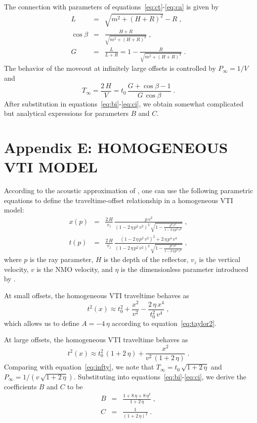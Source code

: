 The connection with parameters of equations~\ref{eq:ct}-\ref{eq:ca} is given by
\begin{eqnarray}
\label{eq:l}
L & = & \sqrt{m^2 + (H+R)^2} - R\;,   \\
\label{eq:cbeta}
\cos{\beta} & = & \frac{H+R}{\sqrt{m^2 + (H+R)^2}}\;, \\
\label{eq:g}
G & = & \frac{L}{L+R} = 1 - \frac{R}{\sqrt{m^2 + (H+R)^2}}\;.
\end{eqnarray}
The behavior of the moveout at infinitely large offsets is controlled by $P_{\infty} = 1/V$ and
\begin{equation}
\label{eq:ctinf3}
T_{\infty} = \frac{2\,H}{V} = t_0\,\frac{G+\cos{\beta} - 1}{G\,\cos{\beta}}\;. 
\end{equation}
After substitution in equations~\ref{eq:bi}-\ref{eq:ci}, we obtain
somewhat complicated but analytical expressions for parameters $B$ and
$C$.

\appendix
\section{Appendix E: HOMOGENEOUS VTI MODEL}

According to the acoustic approximation of
\cite{GEO63-02-06230631}, one can use the following parametric
equations to define the traveltime-offset relationship in a
homogeneous VTI model:
\begin{eqnarray}
\label{eq:xpvti}
x(p) & = & \frac{2\,H}{v_z}\,\frac{p\,v^2}{(1-2\,\eta\,p^2\,v^2)^2\,\sqrt{1-\frac{p^2\,v^2}{1-2\,\eta\,p^2\,v^2}}}\;, \\
\label{eq:tpvti}
t(p) & = & \frac{2\,H}{v_z}\,\frac{(1-2\,\eta\,p^2\,v^2)^2 + 2\,\eta\,p^4\,v^4}
{(1-2\,\eta\,p^2\,v^2)^2\,\sqrt{1-\frac{p^2\,v^2}{1-2\,\eta\,p^2\,v^2}}}\;,
\end{eqnarray}
where $p$ is the ray parameter, $H$ is the depth of the reflector,
$v_z$ is the vertical velocity, $v$ is the NMO velocity, and $\eta$ is
the dimensionless parameter introduced by \cite{GEO60-05-15501566}.

At small offsets, the homogeneous VTI traveltime behaves as
\begin{equation}
\label{eq:vtismall}
t^2(x) \approx t_0^2 + \frac{x^2}{v^2} - \frac{2\,\eta\,x^4}{t_0^2\,v^4}\;,
\end{equation} 
which allows us to define $A=-4\,\eta$ according to equation~\ref{eq:taylor2}.

At large offsets, the homogeneous VTI traveltime behaves as
\begin{equation}
\label{eq:vtilarge}
t^2(x) \approx t_0^2\,(1+2\,\eta) + \frac{x^2}{v^2\,(1+2\,\eta)}\;.
\end{equation} 
Comparing with equation~\ref{eq:infty}, we note that $T_{\infty} =
t_0\,\sqrt{1+2\,\eta}$ and $P_{\infty} =
1/(v\,\sqrt{1+2\,\eta})$. Substituting into
equations~\ref{eq:bi}-\ref{eq:ci}, we derive the coefficients $B$ and
$C$ to be
\begin{eqnarray}
\label{eq:bvti}
B & = & \frac{1 + 8\,\eta + 8\,\eta^2}{1 + 2\,\eta}\;, \\
\label{eq:cvti}
C & = & \frac{1}{(1 + 2\,\eta)^2}\;.
\end{eqnarray}

\nocite{Sword.sep.51.313}




